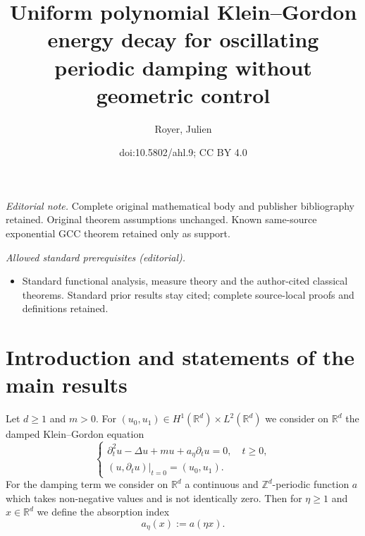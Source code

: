 \documentclass[10pt]{amsart}
\title{Uniform polynomial Klein–Gordon energy decay for oscillating periodic damping without geometric control}
\author{Royer, Julien}
\date{doi:10.5802/ahl.9; CC BY 4.0}
\theoremstyle{definition}\newtheorem{defi}[theo]{Definition}\newtheorem{rema}[theo]{Remark}\newtheorem{exam}[theo]{Example}\newtheorem{exem}[theo]{Example}\newtheorem{nota}[theo]{Notation}
\renewcommand{\geq}{\geqslant}
\newcommand{\1}{\mathds 1}
\newcommand{\R}{\mathbb{R}}
\newcommand{\D}{\Delta}
\begin{document}
\maketitle
\noindent\textit{Editorial note.} Complete original mathematical body and publisher bibliography retained. Original theorem assumptions unchanged. Known same-source exponential GCC theorem retained only as support.\par\medskip
\noindent\textit{Allowed standard prerequisites (editorial).}\begin{itemize}
\item Standard functional analysis, measure theory and the author-cited classical theorems. Standard prior results stay cited; complete source-local proofs and definitions retained.
\end{itemize}\medskip

\section{Introduction and statements of the main results}

Let $d \geq 1$ and $m> 0$. For $(u_0,u_1) \in H^1(\R^d)\times L^2(\R^d)$ we consider on $\R^d$ the damped Klein--Gordon equation
\begin{equation}\label{KG}
\begin{cases}
\partial_t^2 u -\D u + mu + a_\eta \partial_t u = 0, \quad t \geq 0,\\
(u,\partial_t u)|_{t=0} = (u_0,u_1).
\end{cases}
\end{equation}
For the damping term we consider on $\R^d$ a continuous and $\mathbb Z^d$-periodic function $a$ which takes non-negative values and is not identically zero. Then for $\eta \geq 1$ and $x \in \R^d$ we define the absorption index
\[
a_\eta(x) := a(\eta x).
\]
\end{document}
